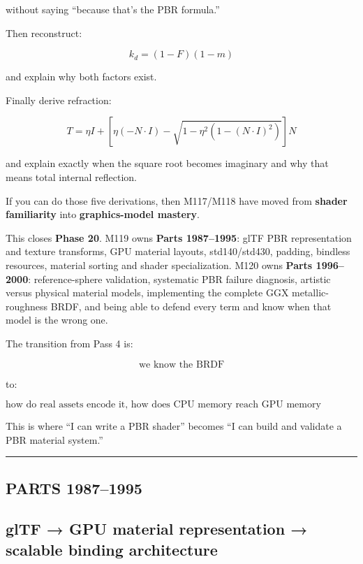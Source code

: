 without saying ``because that's the PBR formula.''

Then reconstruct:

\[
k_d=(1-F)(1-m)
\]

and explain why both factors exist.

Finally derive refraction:

\[
T=
\eta I+
\left[
\eta(-N\cdot I)
-
\sqrt{
1-\eta^2
(1-(N\cdot I)^2)
}
\right]N
\]

and explain exactly when the square root becomes imaginary and why that means total internal reflection.

If you can do those five derivations, then M117/M118 have moved from \textbf{shader familiarity} into \textbf{graphics-model mastery}.

This closes \textbf{Phase 20}. M119 owns \textbf{Parts 1987--1995}: glTF PBR representation and texture transforms, GPU material layouts, std140/std430, padding, bindless resources, material sorting and shader specialization. M120 owns \textbf{Parts 1996--2000}: reference-sphere validation, systematic PBR failure diagnosis, artistic versus physical material models, implementing the complete GGX metallic-roughness BRDF, and being able to defend every term and know when that model is the wrong one.

The transition from Pass 4 is:

\[
\boxed{
\text{we know the BRDF}
}
\]

to:

\[
\boxed{
\text{how do real assets encode it, how does CPU memory reach GPU memory correctly, how do thousands of materials scale, and how do we prove the resulting renderer is actually correct?}
}
\]

This is where ``I can write a PBR shader'' becomes ``I can build and validate a PBR material system.''

\begin{center}\rule{0.5\linewidth}{0.5pt}\end{center}

\subsection{PARTS 1987--1995}\label{03-visual-computing-i-ch006-parts-19871995}

\hypertarget{03-visual-computing-i-ch006-parts-19871995}{}

\subsection{glTF → GPU material representation → scalable binding architecture}\label{03-visual-computing-i-ch006-gltf-gpu-material-representation-scalable-binding-architecture}

